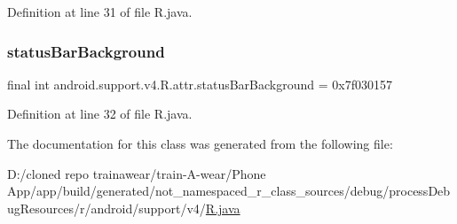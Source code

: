 Definition at line 31 of file R.\+java.

\mbox{\label{classandroid_1_1support_1_1v4_1_1_r_1_1attr_aa59473f9f702e6a039b2abe1820fc4b7}} 
\subsubsection{\texorpdfstring{statusBarBackground}{statusBarBackground}}
{\footnotesize\ttfamily final int android.\+support.\+v4.\+R.\+attr.\+status\+Bar\+Background = 0x7f030157\hspace{0.3cm}{\ttfamily [static]}}



Definition at line 32 of file R.\+java.



The documentation for this class was generated from the following file\+:\begin{DoxyCompactItemize}
\item 
D\+:/cloned repo trainawear/train-\/\+A-\/wear/\+Phone App/app/build/generated/not\+\_\+namespaced\+\_\+r\+\_\+class\+\_\+sources/debug/process\+Debug\+Resources/r/android/support/v4/\mbox{\hyperlink{process_debug_resources_2r_2android_2support_2v4_2_r_8java}{R.\+java}}\end{DoxyCompactItemize}
